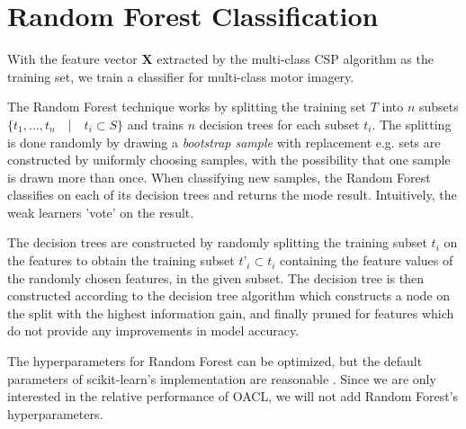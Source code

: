 \section{Random Forest Classification}
With the feature vector $\mathbf{X}$ extracted by the multi-class CSP algorithm as the training set, we train a classifier for multi-class motor imagery.

The Random Forest technique works by splitting the training set $T$ into $n$ subsets $\{t_1,…,t_n \quad | \quad t_i \subset S\}$ and trains $n$ decision trees for each subset $t_i$. The splitting is done randomly by drawing a \emph{bootstrap sample} with replacement e.g. sets are constructed by uniformly choosing samples, with the possibility that one sample is drawn more than once. When classifying new samples, the Random Forest classifies on each of its decision trees and returns the mode result. Intuitively, the weak learners 'vote' on the result.

The decision trees are constructed by randomly splitting the training subset $t_i$ on the features to obtain the training subset $t’_i \subset t_i$ containing the feature values of the randomly chosen features, in the given subset. The decision tree is then constructed according to the decision tree algorithm which constructs a node on the split with the highest information gain, and finally pruned for features which do not provide any improvements in model accuracy.

The hyperparameters for Random Forest can be optimized, but the default parameters of scikit-learn's implementation are reasonable \citep{bernard2009influence}. Since we are only interested in the relative performance of OACL, we will not add Random Forest's hyperparameters.